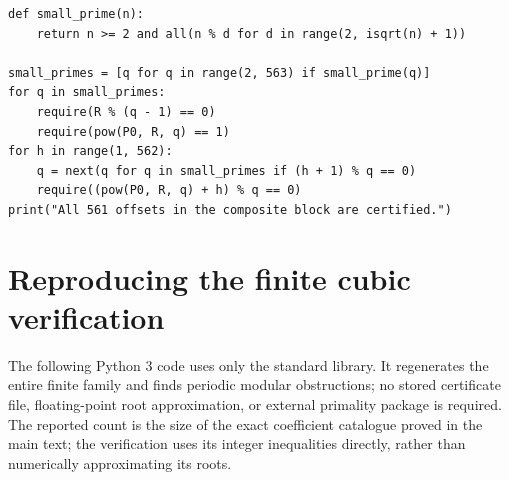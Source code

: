 \documentclass[11pt,a4paper]{article}
\theoremstyle{definition}
\theoremstyle{remark}
\numberwithin{equation}{section}
\begin{document}
\begin{lstlisting}
def small_prime(n):
    return n >= 2 and all(n % d for d in range(2, isqrt(n) + 1))

small_primes = [q for q in range(2, 563) if small_prime(q)]
for q in small_primes:
    require(R % (q - 1) == 0)
    require(pow(P0, R, q) == 1)
for h in range(1, 562):
    q = next(q for q in small_primes if (h + 1) % q == 0)
    require((pow(P0, R, q) + h) % q == 0)
print("All 561 offsets in the composite block are certified.")

\end{lstlisting}


\clearpage
{}

\section{Reproducing the finite cubic verification}\label{tw:app:cubic-verification}
The following Python 3 code uses only the standard library. It regenerates
the entire finite family and finds periodic modular obstructions; no
stored certificate file, floating-point root approximation, or external
primality package is required. The reported count is the size of the exact coefficient catalogue
proved in the main text; the verification uses its integer inequalities
directly, rather than numerically approximating its roots.

\begingroup
{}
\end{document}
